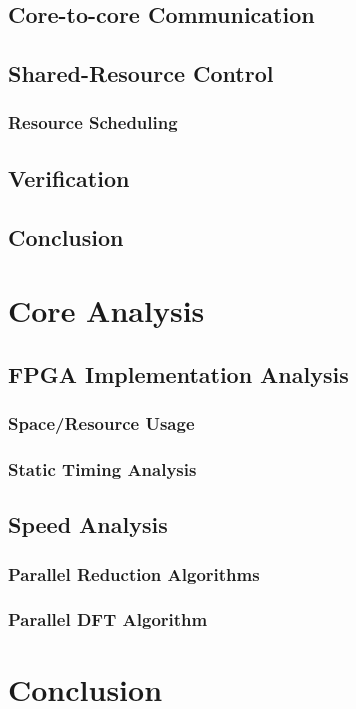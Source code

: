\documentclass[11pt,a4paper,twoside]{report}
\begin{document}
    \section{Core-to-core Communication}
    \section{Shared-Resource Control}
        \subsection{Resource Scheduling}
    \section{Verification}
    \section{Conclusion}

\chapter{Core Analysis}
    \section{FPGA Implementation Analysis}
        \subsection{Space/Resource Usage}
        \subsection{Static Timing Analysis}
    \section{Speed Analysis}
        \subsection{Parallel Reduction Algorithms}
        \subsection{Parallel DFT Algorithm}


\chapter{Conclusion}
\end{document}
